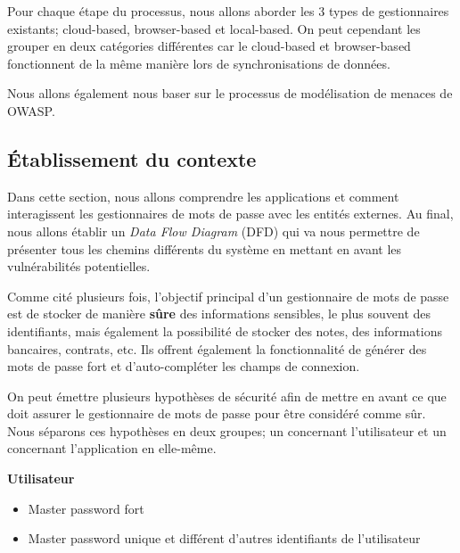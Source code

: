 Pour chaque étape du processus, nous allons aborder les 3 types de gestionnaires existants; cloud-based, browser-based et local-based. On peut cependant les grouper en deux catégories différentes car le cloud-based et browser-based fonctionnent de la même manière lors de synchronisations de données.

Nous allons également nous baser sur le processus de modélisation de menaces de OWASP\cite{owasp}.
\subsection{Établissement du contexte}
Dans cette section, nous allons comprendre les applications et comment interagissent les gestionnaires de mots de passe avec les entités externes. Au final, nous allons établir un \textit{Data Flow Diagram} (DFD) qui va nous permettre de présenter tous les chemins différents du système en mettant en avant les vulnérabilités potentielles.

Comme cité plusieurs fois, l'objectif principal d'un gestionnaire de mots de passe est de stocker de manière \textbf{sûre} des informations sensibles, le plus souvent des identifiants, mais également la possibilité de stocker des notes, des informations bancaires, contrats, etc. Ils offrent également la fonctionnalité de générer des mots de passe fort et d'auto-compléter les champs de connexion.

On peut émettre plusieurs hypothèses de sécurité afin de mettre en avant ce que doit assurer le gestionnaire de mots de passe pour être considéré comme sûr. Nous séparons ces hypothèses en deux groupes; un concernant l'utilisateur et un concernant l'application en elle-même. 

\textbf{Utilisateur}
\begin{itemize}
	\item Master password fort
	\item Master password unique et différent d'autres identifiants de l'utilisateur
\end{itemize}

